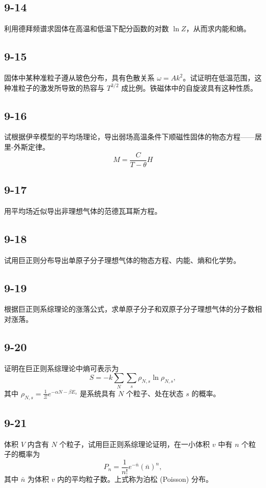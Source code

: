 \newpage
\subsection{9-14}
利用德拜频谱求固体在高温和低温下配分函数的对数 $\ln Z$，从而求内能和熵。

\newpage
\subsection{9-15}
固体中某种准粒子遵从玻色分布，具有色散关系 $\omega = Ak^2$。试证明在低温范围，这种准粒子的激发所导致的热容与 $T^{3/2}$ 成比例。铁磁体中的自旋波具有这种性质。

\newpage
\subsection{9-16}
试根据伊辛模型的平均场理论，导出弱场高温条件下顺磁性固体的物态方程——居里-外斯定律。
$$ M = \frac{C}{T - \theta} H $$

\newpage
\subsection{9-17}
用平均场近似导出非理想气体的范德瓦耳斯方程。

\newpage
\subsection{9-18}
试用巨正则分布导出单原子分子理想气体的物态方程、内能、熵和化学势。

\newpage
\subsection{9-19}
根据巨正则系综理论的涨落公式，求单原子分子和双原子分子理想气体的分子数相对涨落。

\newpage
\subsection{9-20}
证明在巨正则系综理论中熵可表示为
$$ S = -k \sum_N \sum_s \rho_{N,s} \ln \rho_{N,s}, $$
其中 $\rho_{N,s} = \frac{1}{\Xi} e^{-\alpha N - \beta E_s}$ 是系统具有 $N$ 个粒子、处在状态 $s$ 的概率。

\newpage
\subsection{9-21}
体积 $V$ 内含有 $N$ 个粒子，试用巨正则系综理论证明，在一小体积 $v$ 中有 $n$ 个粒子的概率为
$$ P_n = \frac{1}{n!} e^{-\bar{n}} (\bar{n})^n, $$
其中 $\bar{n}$ 为体积 $v$ 内的平均粒子数。上式称为泊松 (Poisson) 分布。

